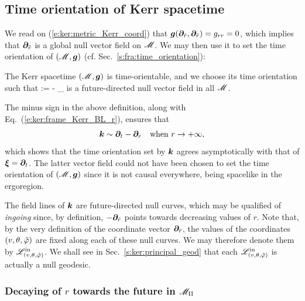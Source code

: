 \subsection{Time orientation of Kerr spacetime} \label{s:ker:time_orientation}

We read on (\ref{e:ker:metric_Kerr_coord}) that
$\bm{g}(\bm{\partial}_{\hat{r}},\bm{\partial}_{\hat{r}}) = g_{rr} = 0$, which
implies that $\bm{\partial}_{\hat{r}}$ is a global null vector field on $\mathscr{M}$.
We may then use it to set the time orientation of $(\mathscr{M},\bm{g})$ (cf. Sec.~\ref{s:fra:time_orientation}):
\begin{prop}
The Kerr spacetime $(\mathscr{M},\bm{g})$ is time-orientable, and we choose its time orientation
such that
\be \label{e:ker:def_k_hat_r}
     := - \wpar_{}
\ee
is a future-directed null vector field in all $\mathscr{M}$.
\end{prop}

\begin{remark}
The minus sign
in the above definition, along with Eq.~(\ref{e:ker:frame_Kerr_BL_r}),
ensures that
\[
    \bm{k} \sim \bm{\partial}_t -  \bm{\partial}_r  \quad\mbox{when}\
            r \rightarrow +\infty ,
\]
which shows that the time orientation set by $\bm{k}$ agrees asymptotically
with that of $\bm{\xi}=\bm{\partial}_t$. The latter vector field could not have been
chosen to set the time orientation of $(\mathscr{M},\bm{g})$ since it is not
causal everywhere, being spacelike in the ergoregion.
\end{remark}

The field lines
of $\bm{k}$ are future-directed null curves,
which may be qualified of \emph{ingoing} since, by definition, $-\bm{\partial}_{\hat{r}}$ points towards
decreasing values of $r$. Note that, by the very definition of
the coordinate vector $\bm{\partial}_{\hat{r}}$,
the values of the coordinates $(v,\theta,{\tilde\varphi})$ are fixed along each of these
null curves. We may therefore denote them by $\mathscr{L}^{\rm in}_{(v,\theta,{\tilde\varphi})}$.
We shall see in Sec.~\ref{s:ker:principal_geod} that each $\mathscr{L}^{\rm in}_{(v,\theta,{\tilde\varphi})}$ is actually a null geodesic.

\subsubsection{Decaying of $r$ towards the future in $\mathscr{M}_{\rm II}$}

